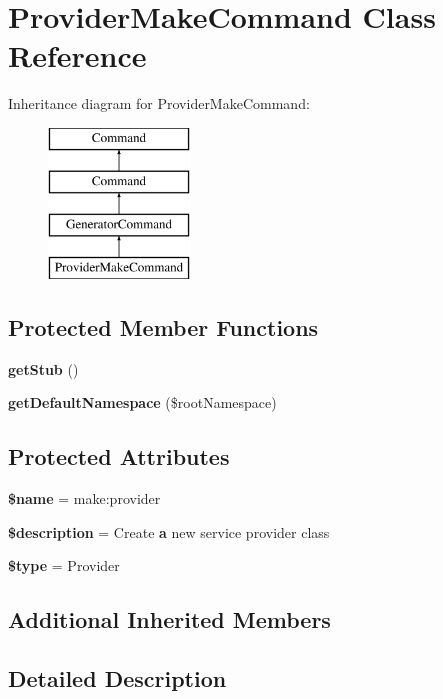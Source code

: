 \section{Provider\+Make\+Command Class Reference}
\label{class_illuminate_1_1_foundation_1_1_console_1_1_provider_make_command}
Inheritance diagram for Provider\+Make\+Command\+:\begin{figure}[H]
\begin{center}
\leavevmode
\includegraphics[height=4.000000cm]{class_illuminate_1_1_foundation_1_1_console_1_1_provider_make_command}
\end{center}
\end{figure}
\subsection*{Protected Member Functions}
\begin{DoxyCompactItemize}
\item 
{\bf get\+Stub} ()
\item 
{\bf get\+Default\+Namespace} (\$root\+Namespace)
\end{DoxyCompactItemize}
\subsection*{Protected Attributes}
\begin{DoxyCompactItemize}
\item 
{\bf \$name} = \textquotesingle{}make\+:provider\textquotesingle{}
\item 
{\bf \$description} = \textquotesingle{}Create {\bf a} new service provider class\textquotesingle{}
\item 
{\bf \$type} = \textquotesingle{}Provider\textquotesingle{}
\end{DoxyCompactItemize}
\subsection*{Additional Inherited Members}


\subsection{Detailed Description}


